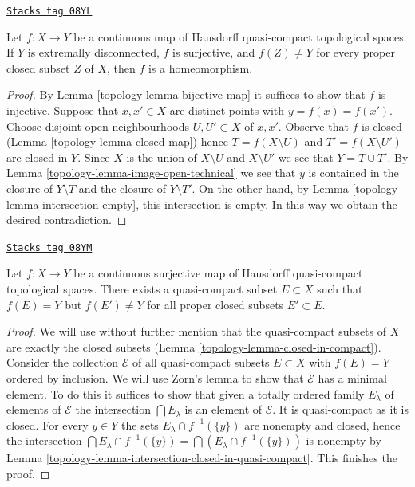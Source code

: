 \begin{lemma}[Isomorphism]
\label{topology-lemma-isomorphism}
\href{https://stacks.math.columbia.edu/tag/08YL}{\texttt{Stacks tag 08YL}}

Let $f : X \to Y$ be a continuous map of Hausdorff quasi-compact
topological spaces. If $Y$ is extremally disconnected, $f$ is surjective,
and $f(Z) \not = Y$ for every proper closed subset $Z$ of $X$, then
$f$ is a homeomorphism.
\end{lemma}

\begin{proof}

By Lemma \ref{topology-lemma-bijective-map} it suffices to show that $f$ is injective.
Suppose that $x, x' \in X$ are distinct points with $y = f(x) = f(x')$.
Choose disjoint open neighbourhoods $U, U' \subset X$ of $x, x'$.
Observe that $f$ is closed (Lemma \ref{topology-lemma-closed-map}) hence
$T = f(X \setminus U)$ and $T' = f(X \setminus U')$ are closed in $Y$.
Since $X$ is the union of $X \setminus U$ and $X \setminus U'$ we see that
$Y = T \cup T'$. By Lemma \ref{topology-lemma-image-open-technical} we
see that $y$ is contained in the closure of $Y \setminus T$ and
the closure of $Y \setminus T'$. On the other hand, by
Lemma \ref{topology-lemma-intersection-empty},
this intersection is empty. In this way we obtain the desired contradiction.
\end{proof}

\begin{lemma}
\label{topology-lemma-find-compact-subset}
\href{https://stacks.math.columbia.edu/tag/08YM}{\texttt{Stacks tag 08YM}}

Let $f : X \to Y$ be a continuous surjective map of Hausdorff quasi-compact
topological spaces. There exists a quasi-compact subset $E \subset X$
such that $f(E) = Y$ but $f(E') \not = Y$ for all proper closed subsets
$E' \subset E$.
\end{lemma}

\begin{proof}

We will use without further mention that the quasi-compact subsets
of $X$ are exactly the closed subsets
(Lemma \ref{topology-lemma-closed-in-compact}).
Consider the collection $\mathcal{E}$ of all quasi-compact subsets
$E \subset X$ with $f(E) = Y$ ordered by inclusion. We will use
Zorn's lemma to show that
$\mathcal{E}$ has a minimal element. To do this it suffices to show
that given a totally ordered family $E_\lambda$ of elements of $\mathcal{E}$
the intersection $\bigcap E_\lambda$ is an element of $\mathcal{E}$.
It is quasi-compact as it is closed.
For every $y \in Y$ the sets $E_\lambda \cap f^{-1}(\{y\})$
are nonempty and closed, hence the intersection
$\bigcap E_\lambda \cap f^{-1}(\{y\}) = \bigcap (E_\lambda \cap f^{-1}(\{y\}))$
is nonempty by
Lemma \ref{topology-lemma-intersection-closed-in-quasi-compact}.
This finishes the proof.
\end{proof}

